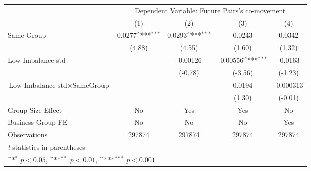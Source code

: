 {
\def\sym#1{\ifmmode^{#1}\else\(^{#1}\)\fi}
\begin{tabular}{l*{4}{c}}
\hline\hline
                &\multicolumn{4}{c}{Dependent Variable:  Future Pairs's co-movement}        \\\cmidrule(lr){2-5}
                &\multicolumn{1}{c}{(1)}         &\multicolumn{1}{c}{(2)}         &\multicolumn{1}{c}{(3)}         &\multicolumn{1}{c}{(4)}         \\
\hline
Same Group      &   0.0277\sym{***}&   0.0293\sym{***}&   0.0243         &   0.0342         \\
                &   (4.88)         &   (4.55)         &   (1.60)         &   (1.32)         \\
[1em]
Low Imbalance std&                  & -0.00126         & -0.00556\sym{***}&  -0.0163         \\
                &                  &  (-0.78)         &  (-3.56)         &  (-1.23)         \\
[1em]
 $ \text{Low Imbalance std} \times {\text{SameGroup} } $ &                  &                  &   0.0194         &-0.000313         \\
                &                  &                  &   (1.30)         &  (-0.01)         \\
\hline
Group Size Effect&       No         &      Yes         &      Yes         &       No         \\
Business Group FE&       No         &       No         &       No         &      Yes         \\
Observations    &   297874         &   297874         &   297874         &   297874         \\
\hline\hline
\multicolumn{5}{l}{\footnotesize \textit{t} statistics in parentheses}\\
\multicolumn{5}{l}{\footnotesize \sym{*} \(p<0.05\), \sym{**} \(p<0.01\), \sym{***} \(p<0.001\)}\\
\end{tabular}
}
